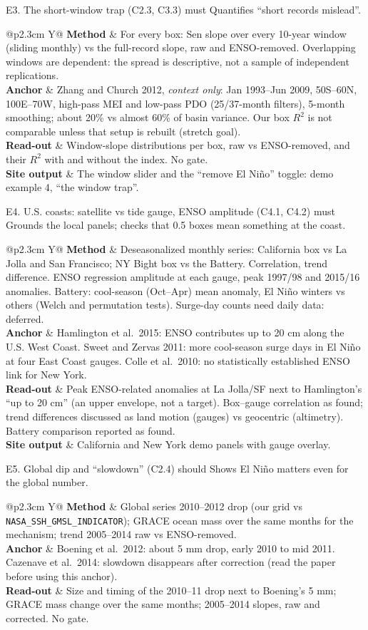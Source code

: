 \documentclass[10pt]{article}
\makeatletter
\newcommand{\row}[2]{\textbf{\sffamily\footnotesize #1} & #2\\}
\newcommand{\card}[1]{\begin{nubox}[]\begin{tabularx}{\linewidth}{@{}p{2.3cm} Y@{}}#1\end{tabularx}\end{nubox}}
\makeatother
\begin{document}
\begin{expbox}{E3. The short-window trap (C2.3, C3.3) \hfill must}
Quantifies ``short records mislead''.
\end{expbox}
\card{
\row{Method}{For every box: Sen slope over every 10-year window (sliding monthly) vs the full-record slope, raw and ENSO-removed. Overlapping
windows are dependent: the spread is descriptive, not a sample of independent replications.}
\row{Anchor}{Zhang and Church 2012, \emph{context only}: Jan 1993--Jun 2009, 50\textdegree S--60\textdegree N, 100\textdegree E--70\textdegree W,
high-pass MEI and low-pass PDO (25/37-month filters), 5-month smoothing; about 20\% vs almost 60\% of basin variance. Our box $R^2$ is not
comparable unless that setup is rebuilt (stretch goal).}
\row{Read-out}{Window-slope distributions per box, raw vs ENSO-removed, and their $R^2$ with and without the index. No gate.}
\row{Site output}{The window slider and the ``remove El Ni\~no'' toggle: demo example 4, ``the window trap''.}
}

\begin{expbox}{E4. U.S. coasts: satellite vs tide gauge, ENSO amplitude (C4.1, C4.2) \hfill must}
Grounds the local panels; checks that 0.5\textdegree{} boxes mean something at the coast.
\end{expbox}
\card{
\row{Method}{Deseasonalized monthly series: California box vs La Jolla and San Francisco; NY Bight box vs the Battery. Correlation, trend
difference. ENSO regression amplitude at each gauge, peak 1997/98 and 2015/16 anomalies. Battery: cool-season (Oct--Apr) mean anomaly,
El Ni\~no winters vs others (Welch and permutation tests). Surge-day counts need daily data: deferred.}
\row{Anchor}{Hamlington et al.\ 2015: ENSO contributes up to 20 cm along the U.S. West Coast. Sweet and Zervas 2011: more cool-season surge
days in El Ni\~no at four East Coast gauges. Colle et al.\ 2010: no statistically established ENSO link for New York.}
\row{Read-out}{Peak ENSO-related anomalies at La Jolla/SF next to Hamlington's ``up to 20 cm'' (an upper envelope, not a target). Box--gauge
correlation as found; trend differences discussed as land motion (gauges) vs geocentric (altimetry). Battery comparison reported as found.}
\row{Site output}{California and New York demo panels with gauge overlay.}
}

\begin{expbox}{E5. Global dip and ``slowdown'' (C2.4) \hfill should}
Shows El Ni\~no matters even for the global number.
\end{expbox}
\card{
\row{Method}{Global series 2010--2012 drop (our grid vs \texttt{NASA\_SSH\_GMSL\_INDICATOR}); GRACE ocean mass over the same months for the
mechanism; trend 2005--2014 raw vs ENSO-removed.}
\row{Anchor}{Boening et al.\ 2012: about 5 mm drop, early 2010 to mid 2011. Cazenave et al.\ 2014: slowdown disappears after correction
(read the paper before using this anchor).}
\row{Read-out}{Size and timing of the 2010--11 drop next to Boening's 5 mm; GRACE mass change over the same months; 2005--2014 slopes, raw and corrected. No gate.}
}
\end{document}
